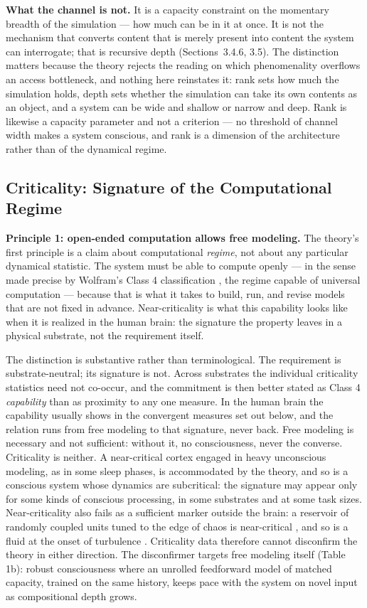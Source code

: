 \documentclass[12pt]{article}
\begin{document}
\textbf{What the channel is not.} It is a capacity constraint on the momentary breadth of the simulation --- how much can be in it at once. It is not the mechanism that converts content that is merely present into content the system can interrogate; that is recursive depth (Sections~3.4.6, 3.5). The distinction matters because the theory rejects the reading on which phenomenality overflows an access bottleneck, and nothing here reinstates it: rank sets how much the simulation holds, depth sets whether the simulation can take its own contents as an object, and a system can be wide and shallow or narrow and deep. Rank is likewise a capacity parameter and not a criterion --- no threshold of channel width makes a system conscious, and rank is a dimension of the architecture rather than of the dynamical regime.

\subsection{Criticality: Signature of the Computational Regime}


\textbf{Principle 1: open-ended computation allows free modeling.} The theory's first principle is a claim about computational \emph{regime}, not about any particular dynamical statistic. The system must be able to compute openly --- in the sense made precise by Wolfram's Class 4 classification \citep{Wolfram2002}, the regime capable of universal computation --- because that is what it takes to build, run, and revise models that are not fixed in advance. Near-criticality is what this capability looks like when it is realized in the human brain: the signature the property leaves in a physical substrate, not the requirement itself.

The distinction is substantive rather than terminological. The requirement is substrate-neutral; its signature is not. Across substrates the individual criticality statistics need not co-occur, and the commitment is then better stated as Class 4 \emph{capability} than as proximity to any one measure. In the human brain the capability usually shows in the convergent measures set out below, and the relation runs from free modeling to that signature, never back. Free modeling is necessary and not sufficient: without it, no consciousness, never the converse. Criticality is neither. A near-critical cortex engaged in heavy unconscious modeling, as in some sleep phases, is accommodated by the theory, and so is a conscious system whose dynamics are subcritical: the signature may appear only for some kinds of conscious processing, in some substrates and at some task sizes. Near-criticality also fails as a sufficient marker outside the brain: a reservoir of randomly coupled units tuned to the edge of chaos is near-critical \citep{BertschingerNatschlaeger2004}, and so is a fluid at the onset of turbulence \citep{Lemoult2016}. Criticality data therefore cannot disconfirm the theory in either direction. The disconfirmer targets free modeling itself (Table 1b): robust consciousness where an unrolled feedforward model of matched capacity, trained on the same history, keeps pace with the system on novel input as compositional depth grows.
\end{document}
